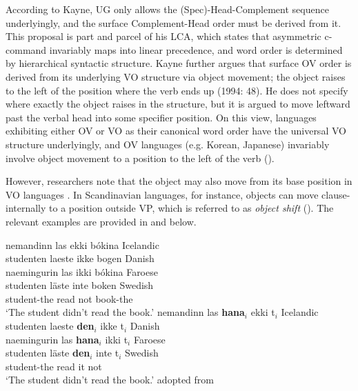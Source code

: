 According to Kayne, \ac{UG} only allows the ({Spec})-Head-Complement sequence underlyingly, and the surface Complement-Head order must be derived from it. This proposal is part and parcel of his \acf{LCA}, which states that asymmetric c-command invariably maps into linear precedence, and word order is determined by hierarchical syntactic structure. Kayne further argues that surface \ac{OV} order is derived from its underlying \ac{VO} structure via object movement; the object raises to the left of the position where the verb ends up (1994: 48). He does not specify where exactly the object raises in the structure, but it is argued to move leftward past the verbal head into some specifier position. On this view, languages exhibiting either \ac{OV} or \ac{VO} as their canonical word order have the universal \ac{VO} structure underlyingly, and \ac{OV} languages (e.g. Korean, Japanese) invariably involve object movement to a position to the left of the verb (\citealt{Kayne2003}).

 However, researchers note that the object may also move from its base position in \ac{VO} languages . In Scandinavian languages, for instance, objects can move clause-internally to a position outside \ac{VP}, which is referred to as \textit{object shift} (\citealt{Holmberg1986}). The relevant examples are provided in  and  below.

\ea\label{ex:47}
 \glllll nemandinn 	las 	ekki 	bókina {} {} {} {}	Icelandic \\
 studenten   	laeste 	ikke 	bogen {} {} {} {}	Danish\\
 naemingurin	las	ikki  	bókina	{} {} {} {}	Faroese\\
 studenten	läste	inte  	boken {} {} {} {} Swedish \\
student-the	read	not	book-the {~~~~~~} {} {} {} \\
\glt `The student didn't read the book.' 
\ex\label{ex:48} \glllll nemandinn 	las \textbf{hana}$_i$	ekki t$_i$ {} {} {}	Icelandic \\
 studenten   	laeste \textbf{den}$_i$	ikke t$_i$ {} {} {}	Danish\\
 naemingurin	las	\textbf{hana}$_i$ ikki	t$_i$ {} {} {}	Faroese\\
 studenten	läste \textbf{den}$_i$	inte t$_i$ {} {} {} Swedish \\
student-the	read	it not {} {~~~~~~~~} {} {} \\
\glt `The student didn't read the book.'  adopted from \citet{Thrainsson1996}
\z

